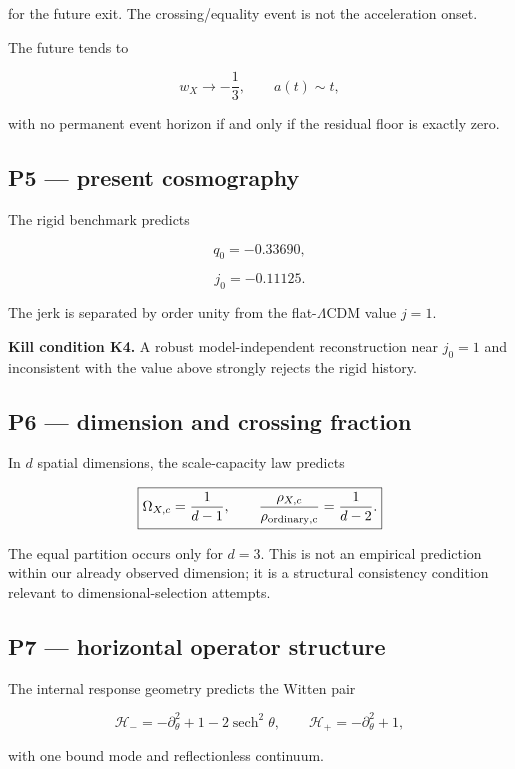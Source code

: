 \documentclass[
  11pt,
  letterpaper,
]{article}
\begin{document}
for the future exit. The crossing/equality event is not the acceleration
onset.

The future tends to

\[
w_X\to-\frac13,
\qquad
a(t)\sim t,
\]

with no permanent event horizon if and only if the residual floor is
exactly zero.

\subsection{P5 --- present cosmography}\label{p5-present-cosmography}

The rigid benchmark predicts

\[
\boxed{q_0=-0.33690,}
\]

\[
\boxed{j_0=-0.11125.}
\]

The jerk is separated by order unity from the flat-\(\Lambda\)CDM value
\(j=1\).

\textbf{Kill condition K4.} A robust model-independent reconstruction
near \(j_0=1\) and inconsistent with the value above strongly rejects
the rigid history.

\subsection{P6 --- dimension and crossing
fraction}\label{p6-dimension-and-crossing-fraction}

In \(d\) spatial dimensions, the scale-capacity law predicts

\[
\boxed{
\Omega_{X,c}=\frac{1}{d-1},
\qquad
\frac{\rho_{X,c}}{\rho_{\rm ordinary,c}}=\frac1{d-2}.
}
\]

The equal partition occurs only for \(d=3\). This is not an empirical
prediction within our already observed dimension; it is a structural
consistency condition relevant to dimensional-selection attempts.

\subsection{P7 --- horizontal operator
structure}\label{p7-horizontal-operator-structure}

The internal response geometry predicts the Witten pair

\[
\mathcal H_-=-\partial_\theta^2+1-2\operatorname{sech}^2\theta,
\qquad
\mathcal H_+=-\partial_\theta^2+1,
\]

with one bound mode and reflectionless continuum.
\end{document}
